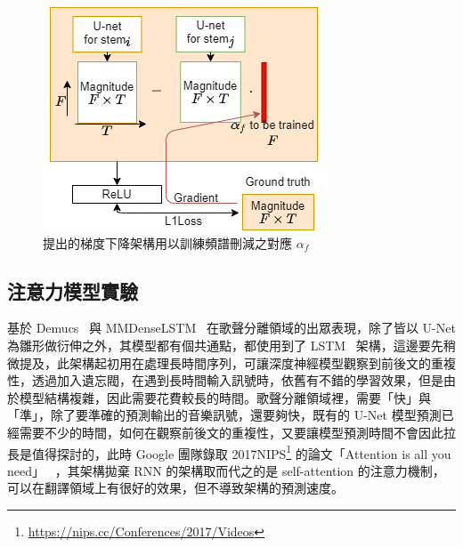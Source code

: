 \begin{figure}[htbp]
    \hfil
    \begin{minipage}[t]{0.45\textwidth}
        \includegraphics[width=\textwidth]{./figures/chapter04_experiment/spectrogram_subtraction_gradientdecent_method.png}
        \caption {提出的梯度下降架構用以訓練頻譜刪減之對應 $\alpha_f$}
        \label{spectrogram_subtraction_NNmethod1}
    \end{minipage}
    \hfil
\end{figure}

\subsection{注意力模型實驗}
基於 Demucs~\cite{defossez2019music} 與 MMDenseLSTM~\cite{takahashi2018mmdenselstm} 在歌聲分離領域的出眾表現，除了皆以 U-Net 為雛形做衍伸之外，其模型都有個共通點，都使用到了 LSTM~\cite{gers1999learning} 架構，這邊要先稍微提及，此架構起初用在處理長時間序列，可讓深度神經模型觀察到前後文的重複性，透過加入遺忘閥，在遇到長時間輸入訊號時，依舊有不錯的學習效果，但是由於模型結構複雜，因此需要花費較長的時間。歌聲分離領域裡，需要「快」與「準」，除了要準確的預測輸出的音樂訊號，還要夠快，既有的 U-Net 模型預測已經需要不少的時間，如何在觀察前後文的重複性，又要讓模型預測時間不會因此拉長是值得探討的，此時 Google 團隊錄取 2017NIPS\footnote{\url{https://nips.cc/Conferences/2017/Videos}} 的論文「Attention is all you need」~\cite{vaswani2017attention} ，其架構拋棄 RNN 的架構取而代之的是 self-attention 的注意力機制，可以在翻譯領域上有很好的效果，但不導致架構的預測速度。

